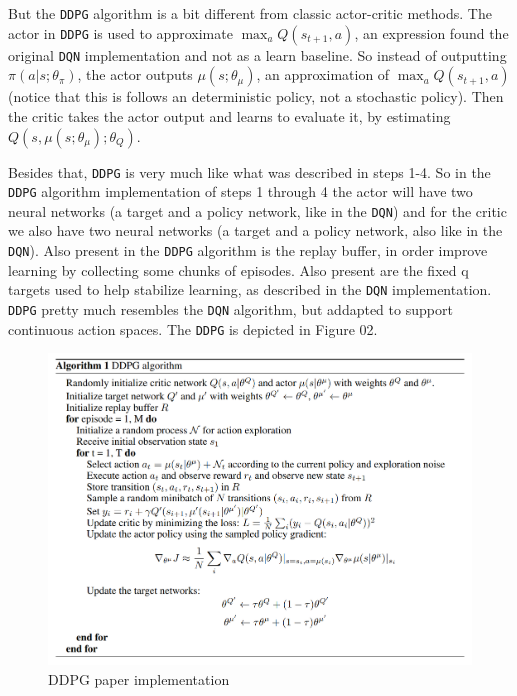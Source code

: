 \documentclass[
]{article}
\begin{document}
But the \texttt{DDPG} algorithm is a bit different from classic
actor-critic methods. The actor in \texttt{DDPG} is used to approximate
\(\max _{a}Q(s_{t+1},a)\), an expression found the original \texttt{DQN}
implementation and not as a learn baseline. So instead of outputting
\(\pi(a|s;\theta_{\pi})\), the actor outputs \(\mu(s;\theta_{\mu})\), an
approximation of \(\max _{a}Q(s_{t+1},a)\) (notice that this is follows
an deterministic policy, not a stochastic policy). Then the critic takes
the actor output and learns to evaluate it, by estimating
\(Q(s,\mu(s;\theta_{\mu});\theta_{Q})\).

Besides that, \texttt{DDPG} is very much like what was described in
steps 1-4. So in the \texttt{DDPG} algorithm implementation of steps 1
through 4 the actor will have two neural networks (a target and a policy
network, like in the \texttt{DQN}) and for the critic we also have two
neural networks (a target and a policy network, also like in the
\texttt{DQN}). Also present in the \texttt{DDPG} algorithm is the replay
buffer, in order improve learning by collecting some chunks of episodes.
Also present are the fixed q targets used to help stabilize learning, as
described in the \texttt{DQN} implementation. \texttt{DDPG} pretty much
resembles the \texttt{DQN} algorithm, but addapted to support continuous
action spaces. The \texttt{DDPG} is depicted in Figure 02.

\begin{figure}
\centering
\includegraphics{imgs/ddpg_print_1.png}
\caption{DDPG paper implementation}
\end{figure}

\pagebreak
\end{document}
